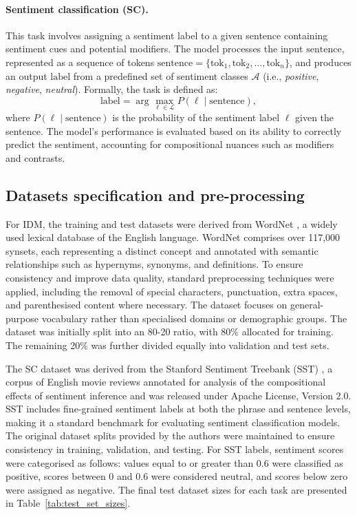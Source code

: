 \paragraph{Sentiment classification (SC).} 
This task involves assigning a sentiment label to a given sentence containing sentiment cues and potential modifiers. The model processes the input \(\text{sentence}\), represented as a sequence of tokens \(\text{sentence} = \{\text{tok}_1, \text{tok}_2, \dots, \text{tok}_n\}\), and produces an output \(\text{label}\) from a predefined set of sentiment classes \(\mathcal{A}\) (i.e., \textit{positive}, \textit{negative}, \textit{neutral}). Formally, the task is defined as:  
\begin{equation}
\text{label} = \arg\max_{\ell \in \mathcal{L}} P(\ell \mid \text{sentence}),
\end{equation}  
where \(P(\ell \mid \text{sentence})\) is the probability of the sentiment label \(\ell\) given the sentence. The model's performance is evaluated based on its ability to correctly predict the sentiment, accounting for compositional nuances such as modifiers and contrasts.  

\subsection{Datasets specification and pre-processing}\label{sec:dataset_appendix}
For IDM, the training and test datasets were derived from WordNet \cite{fellbaum1998wordnet}, a widely used lexical database of the English language. WordNet comprises over 117,000 synsets, each representing a distinct concept and annotated with semantic relationships such as hypernyms, synonyms, and definitions. To ensure consistency and improve data quality, standard preprocessing techniques were applied, including the removal of special characters, punctuation, extra spaces, and parenthesised content where necessary. The dataset focuses on general-purpose vocabulary rather than specialised domains or demographic groups. The dataset was initially split into an 80-20 ratio, with 80\% allocated for training. The remaining 20\% was further divided equally into validation and test sets. 

The SC dataset was derived from the Stanford Sentiment Treebank (SST) \cite{socher2013recursive}, a corpus of English movie reviews annotated for analysis of the compositional effects of sentiment inference and was released under Apache License, Version 2.0. SST includes fine-grained sentiment labels at both the phrase and sentence levels, making it a standard benchmark for evaluating sentiment classification models. The original dataset splits provided by the authors were maintained to ensure consistency in training, validation, and testing. For SST labels, sentiment scores were categorised as follows: values equal to or greater than 0.6 were classified as positive, scores between 0 and 0.6 were considered neutral, and scores below zero were assigned as negative. The final test dataset sizes for each task are presented in Table~\ref{tab:test_set_sizes}.


